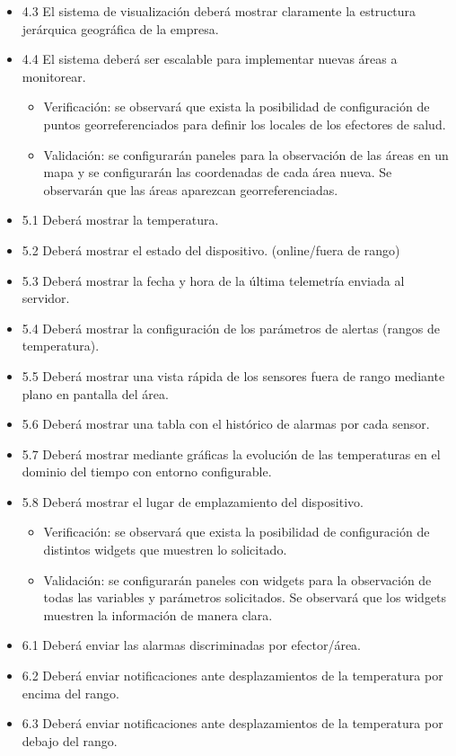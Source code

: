 \documentclass[11pt]{charter}
\begin{document}
\begin{itemize}
\item 4.3 El sistema de visualización deberá mostrar claramente la estructura jerárquica geográfica de la empresa.	
\item 4.4 El sistema deberá ser escalable para implementar nuevas áreas a monitorear.
\begin{itemize}
\item Verificación: se observará que exista la posibilidad de configuración de puntos georreferenciados para definir los locales de los efectores de salud.
\item Validación: se configurarán paneles para la observación de las áreas en un mapa y se configurarán las coordenadas de cada área nueva. Se observarán que las áreas aparezcan georreferenciadas.
\end{itemize}

\item 5.1 Deberá mostrar la temperatura.
\item 5.2 Deberá mostrar el estado del dispositivo. (online/fuera de rango)
\item 5.3 Deberá mostrar la fecha y hora de la última telemetría enviada al servidor.
\item 5.4 Deberá mostrar la configuración de los parámetros de alertas (rangos de temperatura).
\item 5.5 Deberá mostrar una vista rápida de los sensores fuera de rango mediante plano en pantalla del área.
\item 5.6 Deberá mostrar una tabla con el histórico de alarmas por cada sensor.
\item 5.7 Deberá mostrar mediante gráficas la evolución de las temperaturas en el dominio del tiempo con entorno configurable.
\item 5.8 Deberá mostrar el lugar de emplazamiento del dispositivo.
\begin{itemize}
\item Verificación: se observará que exista la posibilidad de configuración de distintos widgets que muestren lo solicitado.
\item Validación: se configurarán paneles con widgets para la observación de todas las variables y parámetros solicitados. Se observará que los widgets muestren la información de manera clara.
\end{itemize}    
  
\item 6.1 Deberá enviar las alarmas discriminadas por efector/área.
\item 6.2 Deberá enviar notificaciones ante desplazamientos de la temperatura por encima del rango.
\item 6.3 Deberá enviar notificaciones ante desplazamientos de la temperatura por debajo del rango.
 

\end{itemize}
\end{document}
